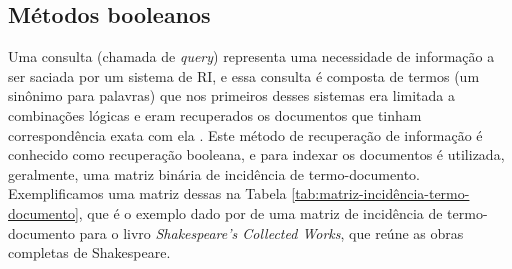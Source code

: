 \subsection{Métodos booleanos} \label{subsec:MétodosBooleanos}

Uma consulta (chamada de \textit{query}) representa uma necessidade de informação a ser saciada por um sistema de RI, e essa consulta é composta de termos (um sinônimo para palavras) que nos primeiros desses sistemas era limitada a combinações lógicas e eram recuperados os documentos que tinham correspondência exata com ela \cite[p.~1446]{Sanderson2012THIRR}. 
Este método de recuperação de informação é conhecido como recuperação booleana, e para indexar os documentos é utilizada, geralmente, uma matriz binária de incidência de termo-documento. 
Exemplificamos uma matriz dessas na Tabela \ref{tab:matriz-incidência-termo-documento}, que é o exemplo dado por  de uma matriz de incidência de termo-documento para o livro \textit{Shakespeare’s Collected Works}, que reúne as obras completas de Shakespeare.


